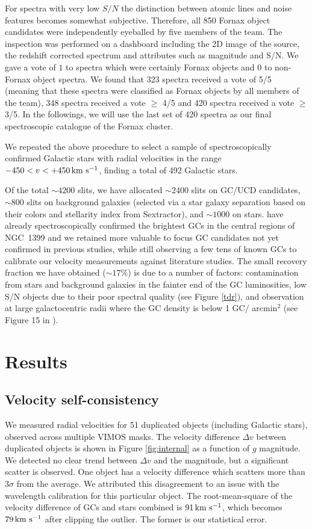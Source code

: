 \documentclass[useAMS,usenatbib]{mn2e}
\newcommand{\kms}{\mbox{\,km~s$^{-1}$}}
\begin{document}
For spectra with very low $S/N$ the distinction between atomic lines and noise 
features becomes somewhat subjective. Therefore, all 850 Fornax object 
candidates were independently eyeballed by five members of the team. The 
inspection was performed on a dashboard including the 2D image of the source, 
the redshift corrected spectrum and attributes such as magnitude and S/N. We 
gave a vote of $1$ to spectra which were certainly Fornax objects and $0$ to 
non-Fornax object spectra. We found that 323 spectra received a vote of 5/5 
(meaning that these spectra were classified as Fornax objects by all members of 
the team), 348 spectra received a vote $\ge$ 4/5 and 420 spectra received a vote 
$\ge$ 3/5. In the followings, we will use the last set of 420 spectra as our 
final spectroscopic catalogue of the Fornax cluster. 

We repeated the above procedure to select a sample of spectroscopically 
confirmed Galactic stars with radial velocities in the range $-450<v<+450 
\kms$, finding a total of 492 Galactic stars.

Of the total $\sim4200$ slits, we have allocated $\sim$2400 slits on GC/UCD candidates, 
$\sim 800$ slits on background galaxies (selected via a star galaxy separation 
based on their colors and stellarity index from Sextractor), and $\sim1000$ 
on stars. \citet{Schuberth} have already spectroscopically confirmed the brightest GCs
in the central regions of NGC~1399 and we retained more valuable to focus GC candidates 
not yet confirmed in previous studies, while still observing a few tens of known GCs to calibrate 
our velocity measurements against literature studies. The small recovery fraction we have 
obtained ($\sim 17\%$) is due to a number of factors: contamination
from stars and background galaxies in the fainter end of the GC 
luminosities, low S/N objects due to their poor spectral quality (see Figure \ref{tdr}),
and observation at large galactocentric radii where the GC density is 
below 1 GC$/$ arcmin$^2$ (see Figure 15 in \citealt{Schuberth} ). 

\section{Results}
\label{sec:analysis}
\subsection{Velocity self-consistency}

We measured radial velocities for 51 duplicated objects (including Galactic 
stars), observed across multiple VIMOS masks. The velocity difference $\Delta 
v$ between duplicated objects is shown in Figure \ref{fig:internal} as a 
function of $g$ magnitude. We detected no clear trend between $\Delta v$ and 
the magnitude, but a significant scatter is observed. One object has a velocity difference which scatters more than 
3$\sigma$ from the average. We attributed this disagreement to an issue with 
the wavelength calibration for this particular object. The root-mean-square of 
the velocity difference of GCs and stars combined is $91 \kms$, which becomes 
$79\kms$ after clipping the outlier. The former is our statistical error.
\end{document}
